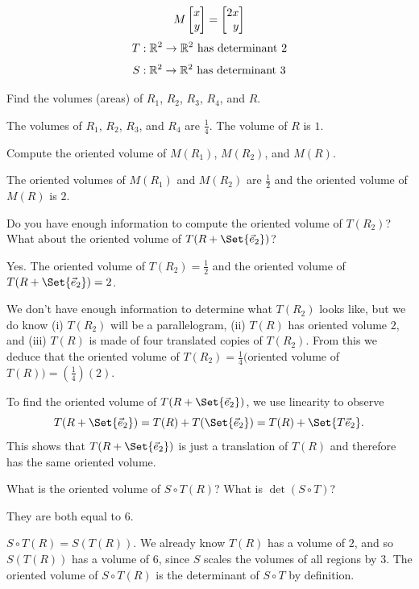 \documentclass{workbook}
\begin{document}
\begin{slide}
\begin{minipage}{.5\textwidth}
	\[M\mat{x\\y}=\mat{2x\\y}\]
	\[T:\mathbb{R}^2\to\mathbb{R}^2\text{ has determinant }2\]
	\[S:\mathbb{R}^2\to\mathbb{R}^2\text{ has determinant }3\]


\end{minipage}

	\begin{parts}
		\item Find the volumes (areas) of $R_1$, $R_2$, $R_3$, $R_4$, and $R$.
			\begin{solution}
				The volumes of $R_1$, $R_2$, $R_3$, and $R_4$ are $\tfrac{1}{4}$. The
				volume of $R$ is $1$.
			\end{solution}
		\item Compute the oriented volume of $M(R_1)$, $M(R_2)$, and $M(R)$.
			\begin{solution}
				The oriented volumes of $M(R_1)$ and $M(R_2)$ are $\tfrac{1}{2}$ and the oriented volume of
				$M(R)$ is $2$.
			\end{solution}
		\item Do you have enough information to compute the oriented volume of $T(R_2)$? What about the oriented volume of $T(R+\Set{\yhat})$?
			\begin{solution}
				Yes. The oriented volume of $T(R_2)=\tfrac{1}{2}$ and the oriented volume of $T(R+\Set{\vec e_2})=2$.

				We don't have enough information to determine what $T(R_2)$ looks like, but we do know (i) $T(R_2)$
				will be a parallelogram, (ii) $T(R)$ has oriented volume $2$, and (iii) $T(R)$ is made of
				four translated copies of $T(R_2)$. From this we deduce that the oriented volume of $T(R_2)=\tfrac{1}{4}\big($oriented
				volume of $T(R)\big)=(\tfrac{1}{4})(2)$.

				To find the oriented volume of $T(R+\Set{\yhat})$, we use linearity to observe
				\[
					T(R+\Set{\yhat})=T(R)+T(\Set{\yhat}) = T(R)+\Set{T\yhat}.
				\]
				This shows that $T(R+\Set{\yhat})$ is just a translation of $T(R)$ and therefore has the same oriented volume.
			\end{solution}
%
		\item What is the oriented volume of $S\circ T(R)$? What is $\det(S\circ T)$?
			\begin{solution}
				They are both equal to $6$.

				$S\circ T(R)=S(T(R))$. We already know $T(R)$ has a volume
				of $2$, and so $S(T(R))$ has a volume of $6$, since $S$ scales
				the volumes of all regions by $3$. The oriented volume of $S\circ T(R)$
				is the determinant of $S\circ T$ by definition.
			\end{solution}
	\end{parts}

\end{slide}
\end{document}
